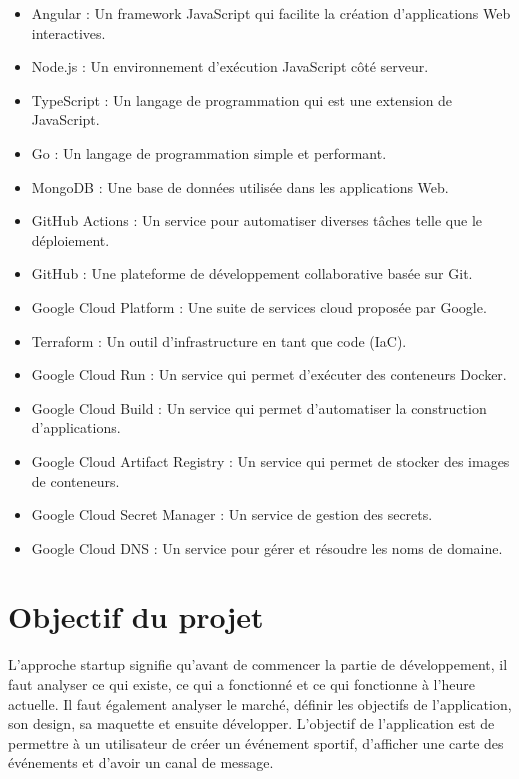 \begin{multicols}{2}
    \begin{itemize}
        \item Angular : Un framework JavaScript qui facilite la création d'applications Web interactives.
        \item Node.js : Un environnement d'exécution JavaScript côté serveur.
        \item TypeScript : Un langage de programmation qui est une extension de JavaScript.
        \item Go : Un langage de programmation simple et performant.
        \item MongoDB : Une base de données utilisée dans les applications Web.
        \item GitHub Actions : Un service pour automatiser diverses tâches telle que le déploiement.
        \item GitHub : Une plateforme de développement collaborative basée sur Git.
        \item Google Cloud Platform : Une suite de services cloud proposée par Google.
        \item Terraform : Un outil d'infrastructure en tant que code (IaC).
        \item Google Cloud Run : Un service qui permet d'exécuter des conteneurs Docker.
        \item Google Cloud Build : Un service qui permet d'automatiser la construction d’applications.
        \item Google Cloud Artifact Registry : Un service qui permet de stocker des images de conteneurs.
        \item Google Cloud Secret Manager : Un service de gestion des secrets.
        \item Google Cloud DNS : Un service pour gérer et résoudre les noms de domaine.
    \end{itemize}
\end{multicols}

\section{Objectif du projet}

L’approche startup signifie qu’avant de commencer la partie de développement, il faut analyser ce qui existe, ce qui a fonctionné et ce qui fonctionne à l’heure actuelle. Il faut également analyser le marché, définir les objectifs de l’application, son design, sa maquette et ensuite développer. L’objectif de l’application est de permettre à un utilisateur de créer un événement sportif, d'afficher une carte des événements et d'avoir un canal de message.

